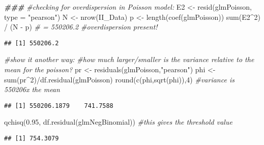 \documentclass[
]{article}
\newenvironment{Shaded}{\begin{snugshade}}{\end{snugshade}}
\newcommand{\AttributeTok}[1]{\textcolor[rgb]{0.77,0.63,0.00}{#1}}
\newcommand{\CommentTok}[1]{\textcolor[rgb]{0.56,0.35,0.01}{\textit{#1}}}
\newcommand{\DecValTok}[1]{\textcolor[rgb]{0.00,0.00,0.81}{#1}}
\newcommand{\DocumentationTok}[1]{\textcolor[rgb]{0.56,0.35,0.01}{\textbf{\textit{#1}}}}
\newcommand{\FloatTok}[1]{\textcolor[rgb]{0.00,0.00,0.81}{#1}}
\newcommand{\FunctionTok}[1]{\textcolor[rgb]{0.00,0.00,0.00}{#1}}
\newcommand{\NormalTok}[1]{#1}
\newcommand{\OtherTok}[1]{\textcolor[rgb]{0.56,0.35,0.01}{#1}}
\newcommand{\SpecialCharTok}[1]{\textcolor[rgb]{0.00,0.00,0.00}{#1}}
\newcommand{\StringTok}[1]{\textcolor[rgb]{0.31,0.60,0.02}{#1}}
\begin{document}
\begin{Shaded}
\begin{Highlighting}[]
\DocumentationTok{\#\#\#}
\CommentTok{\#checking for overdispersion in Poisson model:}
\NormalTok{E2 }\OtherTok{\textless{}{-}} \FunctionTok{resid}\NormalTok{(glmPoisson, }\AttributeTok{type =} \StringTok{"pearson"}\NormalTok{)}
\NormalTok{N  }\OtherTok{\textless{}{-}} \FunctionTok{nrow}\NormalTok{(II\_Data)}
\NormalTok{p  }\OtherTok{\textless{}{-}} \FunctionTok{length}\NormalTok{(}\FunctionTok{coef}\NormalTok{(glmPoisson))   }
\FunctionTok{sum}\NormalTok{(E2}\SpecialCharTok{\^{}}\DecValTok{2}\NormalTok{) }\SpecialCharTok{/}\NormalTok{ (N }\SpecialCharTok{{-}}\NormalTok{ p) }\CommentTok{\# =  550206.2 \#overdispersion present!}
\end{Highlighting}
\end{Shaded}

\begin{verbatim}
## [1] 550206.2
\end{verbatim}

\begin{Shaded}
\begin{Highlighting}[]
\CommentTok{\#show it another way:}
\CommentTok{\#how much larger/smaller is the variance relative to the mean for the poisson?}
\NormalTok{pr }\OtherTok{\textless{}{-}} \FunctionTok{residuals}\NormalTok{(glmPoisson,}\StringTok{"pearson"}\NormalTok{)}
\NormalTok{phi }\OtherTok{\textless{}{-}} \FunctionTok{sum}\NormalTok{(pr}\SpecialCharTok{\^{}}\DecValTok{2}\NormalTok{)}\SpecialCharTok{/}\FunctionTok{df.residual}\NormalTok{(glmPoisson)}
\FunctionTok{round}\NormalTok{(}\FunctionTok{c}\NormalTok{(phi,}\FunctionTok{sqrt}\NormalTok{(phi)),}\DecValTok{4}\NormalTok{) }\CommentTok{\#variance is 550206x the mean}
\end{Highlighting}
\end{Shaded}

\begin{verbatim}
## [1] 550206.1879    741.7588
\end{verbatim}

\begin{Shaded}
\begin{Highlighting}[]
\FunctionTok{qchisq}\NormalTok{(}\FloatTok{0.95}\NormalTok{, }\FunctionTok{df.residual}\NormalTok{(glmNegBinomial)) }\CommentTok{\#this gives the threshold value}
\end{Highlighting}
\end{Shaded}

\begin{verbatim}
## [1] 754.3079
\end{verbatim}
\end{document}
